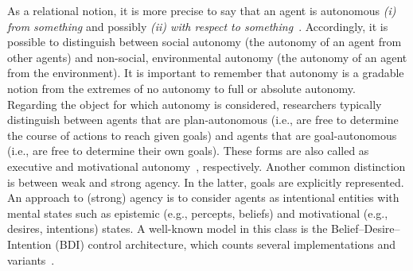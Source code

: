 \documentclass[jsan,article,accept,moreauthors,pdftex]{Definitions/mdpi}
\begin{document}
As a relational notion,
 it is more precise to say that 
 an agent is autonomous \emph{(i) from something}
 and possibly \emph{(ii) with respect to something}~\cite{Castelfranchi2003founding-autonomy}.
%
Accordingly, it is possible to distinguish
 between
 {social autonomy} (the autonomy of an agent from other agents)
 and 
 non-social, {environmental autonomy} (the autonomy of an agent from the environment).
%
It is important to remember that autonomy is a {gradable} notion from the extremes of no autonomy to full or {absolute} autonomy.
%
Regarding the object for which autonomy is considered,
 researchers typically distinguish between
 agents that are
 {plan-autonomous} (i.e., are free to determine the course of actions to reach given goals)
 and agents that are {goal-autonomous} (i.e., are free to determine their own goals).
%
These forms are also called as {executive} and {motivational} autonomy~\cite{castelfranchi1994guarantees-for-autonomy-cognitive-agent-arch}, respectively.
%
Another common distinction is 
 between {weak} and {strong agency}.
%
In the latter, {goals} are explicitly represented.
%
An approach to (strong) agency is to consider agents 
 as {intentional} entities with {mental states}
 such as {epistemic} (e.g., percepts, beliefs)
 and {motivational} (e.g., desires, intentions) states.
%
A well-known model in this class is the {Belief--Desire--Intention (BDI)} control architecture, which counts several implementations and variants~\cite{desilva2020bdi}.
\end{document}

